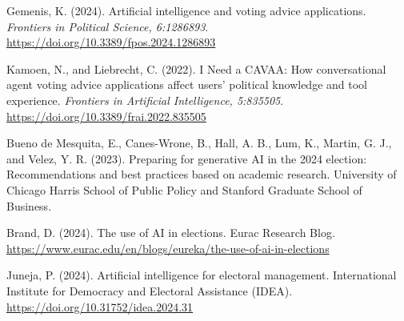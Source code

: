 \documentclass{article}
\begin{document}
\begin{thebibliography}{99}

Gemenis, K. (2024). Artificial intelligence and voting advice applications. \textit{Frontiers in Political Science, 6:1286893}. \url{https://doi.org/10.3389/fpos.2024.1286893}

Kamoen, N., and Liebrecht, C. (2022). I Need a CAVAA: How conversational agent voting advice applications affect users' political knowledge and tool experience. \textit{Frontiers in Artificial Intelligence, 5:835505}. \url{https://doi.org/10.3389/frai.2022.835505}

Bueno de Mesquita, E., Canes-Wrone, B., Hall, A. B., Lum, K., Martin, G. J., and Velez, Y. R. (2023). Preparing for generative AI in the 2024 election: Recommendations and best practices based on academic research. University of Chicago Harris School of Public Policy and Stanford Graduate School of Business.

Brand, D. (2024). The use of AI in elections. Eurac Research Blog. \url{https://www.eurac.edu/en/blogs/eureka/the-use-of-ai-in-elections}

Juneja, P. (2024). Artificial intelligence for electoral management. International Institute for Democracy and Electoral Assistance (IDEA). \url{https://doi.org/10.31752/idea.2024.31}

\end{thebibliography}
\end{document}
